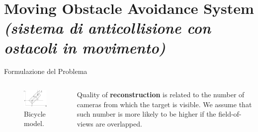 \documentclass{beamer}
\begin{document}
	\section{Moving Obstacle Avoidance System {\itshape \large (sistema di anticollisione con ostacoli in movimento)}} %
		
	\begin{frame}{Formulazione del Problema} 
		\begin{columns}[onlytextwidth,T]
			\begin{column}[c]{0.35\textwidth}
				\begin{figure}
					\centering
					\includegraphics[width=
					\textwidth]{./images/car_model.pdf}
					\caption{Bicycle model.}
					\label{fig:car_model}
				\end{figure}
			\end{column}			
			\begin{column}[c]{0.6\textwidth}
					 Quality of \textbf{reconstruction} is related to the number
					of cameras from which the target is visible.
					We assume that such number is more likely to be
					higher if the field-of-views are overlapped.
			\end{column}
		\end{columns}
	\end{frame}
	
\end{document}

